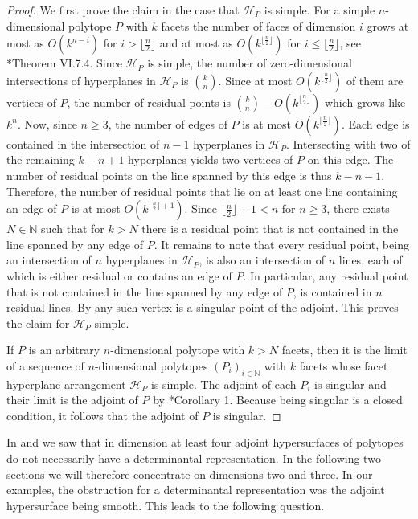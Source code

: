 \documentclass[a4paper,10pt]{amsart}
\theoremstyle{definition}
\theoremstyle{plain}
\newcommand{\cH}{{\mathcal H}}
\newcommand{\N}{{\mathbb N}}
\begin{document}
\begin{proof}
    We first prove the claim in the case that $\cH_P$ is simple.
    For a simple $n$-dimensional polytope $P$ with $k$ facets the number of faces of dimension $i$ grows at most as $O(k^{n-i})$ for $i> \lfloor \frac{n}{2} \rfloor$ and at most as $O(k^{\lfloor \frac{n}{2} \rfloor})$ for $i\leq \lfloor \frac{n}{2} \rfloor$, see \cite{barvinok}*{Theorem VI.7.4}.
    Since $\mathcal{H}_P$ is simple, the number of zero-dimensional intersections of hyperplanes in $\mathcal{H}_P$ is $\binom{k}{n}$. Since at most $O(k^{\lfloor \frac{n}{2} \rfloor})$ of them are vertices of $P$, the number of residual points is $\binom{k}{n}-O(k^{\lfloor \frac{n}{2} \rfloor})$ which grows like $k^n$. Now, since $n\geq 3$, the number of edges of $P$ is at most $O(k^{\lfloor \frac{n}{2} \rfloor})$. Each edge is contained in the intersection of $n-1$ hyperplanes in $\mathcal{H}_P$. Intersecting with two of the remaining $k-n+1$ hyperplanes yields two vertices of $P$ on this edge. The number of residual points on the line spanned by this edge is thus $k-n-1$. Therefore, the number of residual points that lie on at least one line containing an edge of $P$ is at most $O(k^{\lfloor\frac{n}{2}\rfloor+1})$. Since $\lfloor\frac{n}{2}\rfloor+1 < n$ for $n\geq 3$, there exists $N\in\mathbb{N}$ such that for $k>N$ there is a residual point that is not contained in the line spanned by any edge of $P$. It remains to note that every residual point, being an intersection of $n$ hyperplanes in $\mathcal{H}_P$, is also an intersection of $n$ lines, each of which is either residual or contains an edge of $P$. In particular, any residual point that is not contained in the line spanned by any edge of $P$, is contained in $n$ residual lines. By  any such vertex is a singular point of the adjoint. This proves the claim for $\cH_P$ simple.

    If $P$ is an arbitrary $n$-dimensional polytope with $k>N$ facets, then it is the limit of a sequence of $n$-dimensional polytopes $(P_i)_{i\in\N}$ with $k$ facets whose facet hyperplane arrangement $\cH_P$ is simple. The adjoint of each $P_i$ is singular and their limit is the adjoint of $P$ by \cite{KohnRanestad2019AdjCurves}*{Corollary 1}. Because being singular is a closed condition, it follows that the adjoint of $P$ is singular.
\end{proof}

In  and  we saw that in dimension at least four adjoint hypersurfaces of polytopes do not necessarily have a determinantal representation. In the following two sections we will therefore concentrate on dimensions two and three. In our examples, the obstruction for a determinantal representation was the adjoint hypersurface being smooth. This leads to the following question.
\end{document}
